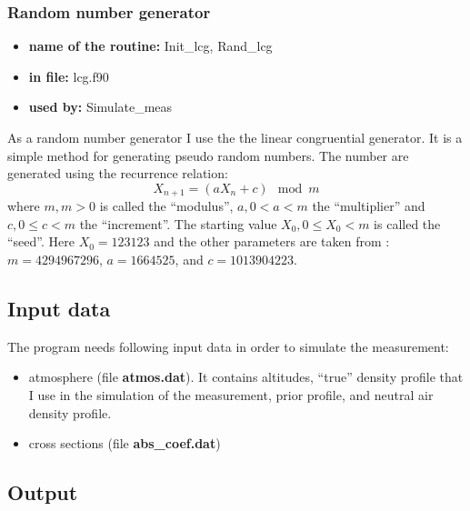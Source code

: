 \documentclass[12pt,a4paper]{article}
\begin{document}
\subsubsection{Random number generator}
\begin{itemize}
 \item \textbf{name of the routine:} Init\_lcg, Rand\_lcg
 \item \textbf{in file:} lcg.f90
  \item \textbf{used by:} Simulate\_meas
\end{itemize}
As a random number generator I use the the linear congruential generator. It is a simple
method for generating pseudo random numbers. The number are generated using the 
recurrence relation:
\begin{equation}
X_{n+1}=(aX_n+c) \mod m
\end{equation}
where $m, m>0$ is called the ``modulus'', $a, 0<a<m$ the ``multiplier'' and $c, 0\leq c<m$ the ``increment''.
The starting value $X_0, 0 \leq X_0 <m$ is called the ``seed''. Here $X_0=123123$ and the other parameters
are taken from \citet{PressEtAl92}: $m = 4294967296$, $a=1664525$, and $c=1013904223$.

\subsection{Input data}
The program needs following input data in order to simulate the measurement:
\begin{itemize}
\item atmosphere (file \textbf{atmos.dat}). It contains altitudes, ``true'' density profile that I use in the simulation of the measurement, prior profile, and neutral air density profile.
\item cross sections (file \textbf{abs\_coef.dat})
\end{itemize}

\subsection{Output}
\end{document}
